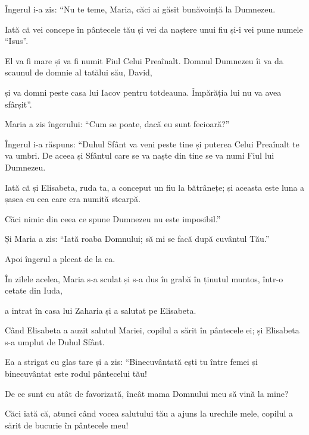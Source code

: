 {Îngerul i-a zis: “Nu te teme, Maria, căci ai găsit bunăvoință la Dumnezeu.

Iată că vei concepe în pântecele tău și vei da naștere unui fiu și-i vei pune numele “Isus”.

El va fi mare și va fi numit Fiul Celui Preaînalt. Domnul Dumnezeu îi va da scaunul de domnie al tatălui său, David,

și va domni peste casa lui Iacov pentru totdeauna. Împărăția lui nu va avea sfârșit”.


\par }{\PP {}Maria a zis îngerului: “Cum se poate, dacă eu sunt fecioară?”


\par }{\PP {}Îngerul i-a răspuns: “Duhul Sfânt va veni peste tine și puterea Celui Preaînalt te va umbri. De aceea și Sfântul care se va naște din tine se va numi Fiul lui Dumnezeu.

Iată că și Elisabeta, ruda ta, a conceput un fiu la bătrânețe; și aceasta este luna a șasea cu cea care era numită stearpă.

Căci nimic din ceea ce spune Dumnezeu nu este imposibil.”


\par }{\PP {}Și Maria a zis: “Iată roaba Domnului; să mi se facă după cuvântul Tău.”

\par }{\PP Apoi îngerul a plecat de la ea.


\par }{\PP {}În zilele acelea, Maria s-a sculat și s-a dus în grabă în ținutul muntos, într-o cetate din Iuda,

a intrat în casa lui Zaharia și a salutat pe Elisabeta.

Când Elisabeta a auzit salutul Mariei, copilul a sărit în pântecele ei; și Elisabeta s-a umplut de Duhul Sfânt.

Ea a strigat cu glas tare și a zis: “Binecuvântată ești tu între femei și binecuvântat este rodul pântecelui tău!

De ce sunt eu atât de favorizată, încât mama Domnului meu să vină la mine?

Căci iată că, atunci când vocea salutului tău a ajuns la urechile mele, copilul a sărit de bucurie în pântecele meu!

}
